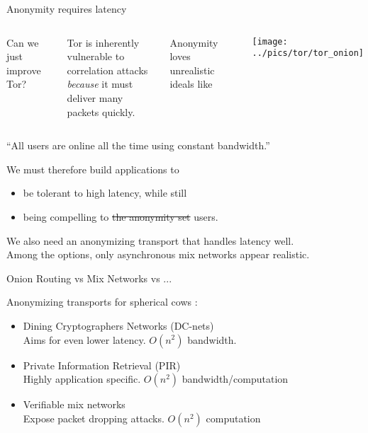 \documentclass[fleqn,xcolor={usenames,dvipsnames}]{beamer}
\begin{document}


\begin{frame}[t]{Anonymity requires latency}
\begin{columns}[T]
\hspace*{20pt} Can we just improve Tor?

\medskip

\hspace*{5pt} Tor is inherently vulnerable to correlation attacks \\
 \hspace*{10pt} {\em because} it must deliver many packets quickly.

\bigskip 

\hspace*{5pt} Anonymity loves unrealistic ideals like

\texttt{[image: ../pics/tor/tor\_onion]}
\end{columns}
\smallskip
\hspace*{1pt} ``All users are online all the time using constant bandwidth.''

\bigskip
\pause

\noindent We must therefore build applications to
\begin{itemize}
\item be tolerant to high latency, while still
\item being compelling to \sout{the anonymity set} users.
\end{itemize}

\smallskip

We also need an anonymizing transport that handles latency well. \\

Among the options, only asynchronous mix networks appear realistic.

\end{frame}


\begin{frame}[t]{Onion Routing vs Mix Networks vs ...}

Anonymizing transports for spherical cows :
\begin{itemize}
\item Dining Cryptographers Networks (DC-nets) \\
 \hspace*{2pt} Aims for even lower latency. $O(n^2)$ bandwidth. 
\item Private Information Retrieval (PIR) \\
 \hspace*{2pt} Highly application specific.  $O(n^2)$ bandwidth/computation
\item Verifiable mix networks \\
 \hspace*{2pt} Expose packet dropping attacks. $O(n^2)$ computation
\end{itemize}

\end{frame}
\end{document}
